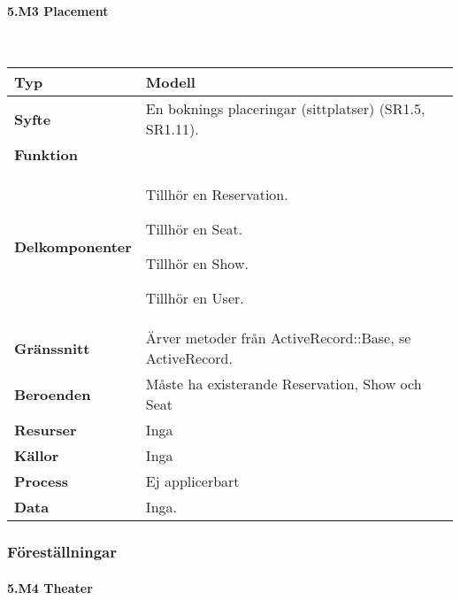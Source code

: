 \documentclass[a4paper, twoside, 11pt, titlepage]{article}
\begin{document}
			\paragraph{5.M3 Placement}\

			\begin {table} [ht] \begin{tabular} {  p{3.5cm} p{11.6cm} }
				\hline
				{\sffamily\textbf{Typ}} & {Modell} \\
				\hline
				{\sffamily\textbf{Syfte}} & {En boknings placeringar (sittplatser) (SR1.5, SR1.11).} \\
				\hline
				{\sffamily\textbf{Funktion}} & { } \\
				\hline
				{\sffamily\textbf{Delkomponenter}} & {Tillhör en Reservation.

Tillhör en Seat.

Tillhör en Show.

Tillhör en User.} \\
				\hline
				{\sffamily\textbf{Gränssnitt}} & {Ärver metoder från ActiveRecord::Base, se ActiveRecord.} \\
				\hline
				{\sffamily\textbf{Beroenden}} & {Måste ha existerande Reservation, Show och Seat} \\
				\hline
				{\sffamily\textbf{Resurser}} & {Inga} \\
				\hline
				{\sffamily\textbf{Källor}} & {Inga} \\
				\hline
				{\sffamily\textbf{Process}} & {Ej applicerbart} \\
				\hline
				{\sffamily\textbf{Data}} & {Inga.} \\
				\hline
			\end{tabular} \end{table} \FloatBarrier


		\clearpage %
		\subsubsection{Föreställningar}



			\paragraph{5.M4 Theater}\
\end{document}
